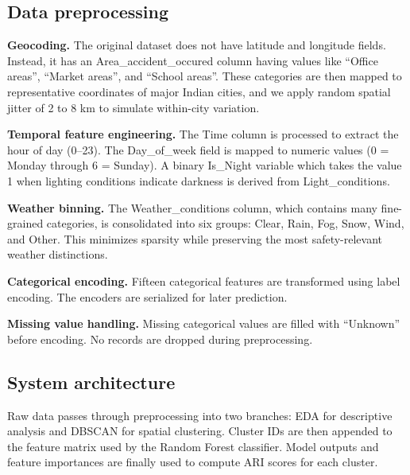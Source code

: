 \documentclass[conference]{IEEEtran}
\begin{document}
\subsection{Data preprocessing}

\textbf{Geocoding.} The original dataset does not have latitude and longitude fields. Instead, it has an Area\_accident\_occured column having values like ``Office areas'', ``Market areas'', and ``School areas''. These categories are then mapped to representative coordinates of major Indian cities, and we apply random spatial jitter of 2 to 8 km to simulate within-city variation.

\textbf{Temporal feature engineering.} The Time column is processed to extract the hour of day (0--23). The Day\_of\_week field is mapped to numeric values (0 = Monday through 6 = Sunday). A binary Is\_Night variable which takes the value 1 when lighting conditions indicate darkness is derived from Light\_conditions.



\textbf{Weather binning.} The Weather\_conditions column, which contains many fine-grained categories, is consolidated into six groups: Clear, Rain, Fog, Snow, Wind, and Other. This minimizes sparsity while preserving the most safety-relevant weather distinctions.

\textbf{Categorical encoding.} Fifteen categorical features are transformed using label encoding. The encoders are serialized for later prediction.

\textbf{Missing value handling.} Missing categorical values are filled with ``Unknown'' before encoding. No records are dropped during preprocessing.

\subsection{System architecture}

Raw data passes through preprocessing into two branches: EDA for descriptive analysis and DBSCAN for spatial clustering. Cluster IDs are then appended to the feature matrix used by the Random Forest classifier. Model outputs and feature importances are finally used to compute ARI scores for each cluster.
\end{document}
